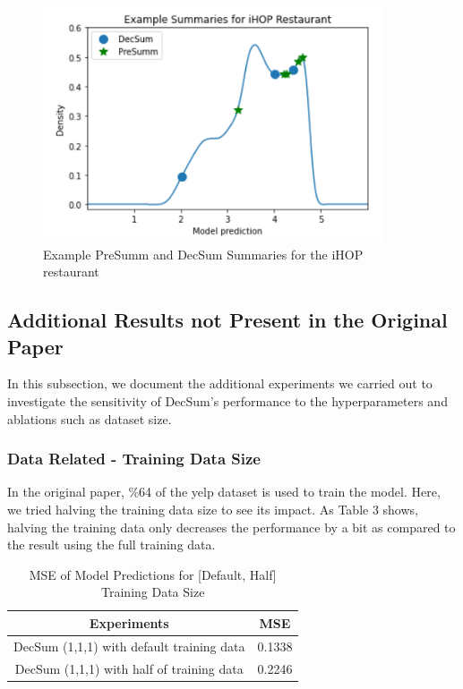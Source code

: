 \documentclass{article}
\begin{document}
\begin{figure}[!ht]
    \centering
    \includegraphics[scale = 0.8]{../assets/PDF}
    \caption{Example PreSumm and DecSum Summaries for the iHOP restaurant}
    \label{fig:2}
\end{figure}

\pagebreak
\subsection{Additional Results not Present in the Original Paper}
In this subsection, we document the additional experiments we carried out to investigate the sensitivity of DecSum's performance to the hyperparameters and ablations such as dataset size.

\subsubsection{Data Related - Training Data Size}
In the original paper, \%64 of the yelp dataset is used to train the model. Here, we tried halving the training data size to see its impact. As Table 3 shows, halving the training data only decreases
the performance by a bit as compared to the result using the full training data.

\begin{table}[ht]
    \centering
    \caption{MSE of Model Predictions for [Default, Half] Training Data Size}
    \begin{tabular}{|c|c|}
        \hline \textbf{Experiments} & \textbf{MSE} \\
        \hline DecSum (1,1,1) with default training data & 0.1338 \\
        \hline DecSum (1,1,1) with half of training data & 0.2246 \\ \hline
    \end{tabular}
\end{table}
\end{document}
